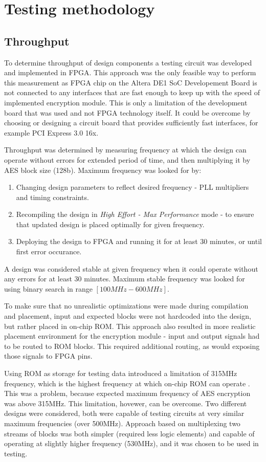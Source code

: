 \section{Testing methodology}
\label{sec:testing-methodology}

\subsection{Throughput}
To determine throughput of design components a testing circuit was developed and implemented in FPGA. This approach was the only feasible way to perform this measurement as FPGA chip on the Altera DE1 SoC Developement Board is not connected to any interfaces that are fast enough to keep up with the speed of implemented encryption module. This is only a limitation of the development board that was used and not FPGA technology itself. It could be overcome by choosing or designing a circuit board that provides sufficiently fast interfaces, for example PCI Express 3.0 16x.

Throughput was determined by measuring frequency at which the design can operate without errors for extended period of time, and then multiplying it by AES block size (128b). Maximum frequency was looked for by:
\begin{enumerate}[nolistsep]
\item Changing design parameters to reflect desired frequency - PLL multipliers and timing constraints.
\item Recompiling the design in \textit{High Effort - Max Performance} mode - to ensure that updated design is placed optimally for given frequency.
\item Deploying the design to FPGA and running it for at least 30 minutes, or until first error occurance.
\end{enumerate}
A design was considered stable at given frequency when it could operate without any errors for at least 30 minutes. Maximum stable frequency was looked for using binary search in range $[100MHz - 600MHz]$. 

To make sure that no unrealistic optimizations were made during compilation and placement, input and expected blocks were not hardcoded into the design, but rather placed in on-chip ROM. This approach also resulted in more realistic placement environment for the encryption module - input and output signals had to be routed to ROM blocks. This required additional routing, as would exposing those signals to FPGA pins. 

Using ROM as storage for testing data introduced a limitation of 315MHz frequency, which is the highest frequency at which on-chip ROM can operate \cite[Table 2-1]{altera-vol1} . This was a problem, because expected maximum frequency of AES encryption was above 315MHz. This limitation, hovewer, can be overcome. Two different designs were considered, both were capable of testing circuits at very similar maximum frequencies (over 500MHz). Approach based on multiplexing two streams of blocks was both simpler (required less logic elements) and capable of operating at slightly higher frequency (530MHz), and it was chosen to be used in testing.


